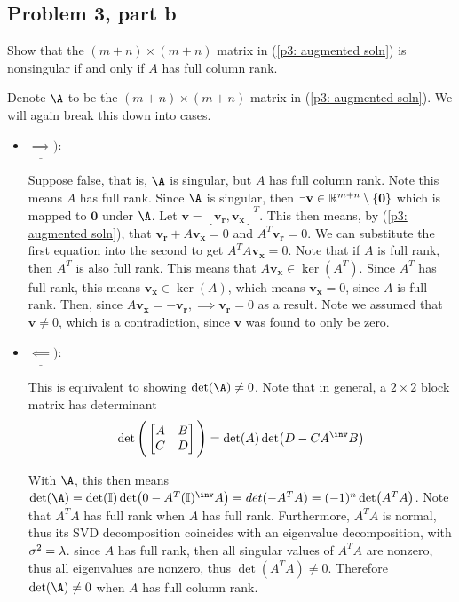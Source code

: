 \subsection{Problem 3, part b}
Show that the $(m + n) \times (m + n)$ matrix in (\ref{p3: augmented soln}) is nonsingular if and only if $A$ has full column rank.
\partbreak
\begin{solution}

    Denote $\A$ to be the $(m + n) \times (m + n)$ matrix in (\ref{p3: augmented soln}). We will again break this down into cases. 

    \begin{itemize}
        \item $\underline{\implies}):$ 

        Suppose false, that is, $\A$ is singular, but $A$ has full column rank. Note this means $A$ has full rank. Since $\A$ is singular, then $\exists \textbf{v} \in \mathbb{R}^{m + n} \setminus \{\textbf{0}\}$ which is mapped to $\textbf{0}$ under $\A$. Let $\textbf{v} = [\textbf{v}_\textbf{r}, \textbf{v}_\textbf{x}]^T$. This then means, by (\ref{p3: augmented soln}), that  $\textbf{v}_\textbf{r} + A\textbf{v}_\textbf{x} = 0$ and $A^T\textbf{v}_\textbf{r} = 0$. We can substitute the first equation into the second to get $A^TA\textbf{v}_\textbf{x} = 0$. Note that if $A$ is full rank, then $A^T$ is also full rank. This means that $A\textbf{v}_\textbf{x} \in \ker(A^T)$. Since $A^T$ has full rank, this means $\textbf{v}_\textbf{x} \in \ker(A)$, which means $\textbf{v}_\textbf{x} =0 $, since $A$ is full rank. Then, since $A\textbf{v}_\textbf{x} = -\textbf{v}_\textbf{r}, \implies \textbf{v}_\textbf{r} = 0$ as a result. Note we assumed that $\textbf{v} \neq 0$, which is a contradiction, since $\textbf{v}$ was found to only be zero. 

        \item $\underline{\impliedby}):$

        This is equivalent to showing $\det (\A) \neq 0$. Note that in general, a $2\times 2$ block matrix has determinant
        \[
        \det \Bigg( \begin{bmatrix}A &B\\C &D\end{bmatrix}\Bigg) = \det(A)\det(D - CA^\inv B)
        \]

        With $\A$, this then means $\det(\A) = \det(\id)\det(0 - A^T(\id)^\inv A) = det(-A^TA) = (-1)^n\det(A^TA)$. Note that $A^TA$ has full rank when $A$ has full rank. Furthermore, $A^TA$ is normal, thus its SVD decomposition coincides with an eigenvalue decomposition, with $\sigma^2 = \lambda$. since $A$ has full rank, then all singular values of $A^TA$ are nonzero, thus all eigenvalues are nonzero, thus $\det(A^TA) \neq 0$. Therefore $\det(\A) \neq 0$ when $A$ has full column rank. 
    \end{itemize}
\end{solution}

